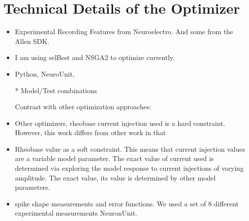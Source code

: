 \section*{Technical Details of the Optimizer}
\begin{itemize}

\item Experimental Recording Features from Neuroelectro. And some from the Allen SDK.
\item I am using selBest and NSGA2 to optimize currently.
\item Python, NeuroUnit, 

* Model/Test combinations

Contrast with other optimization approaches:

\item Other optimizers, rheobase current injection used is a hard constraint. However, this work differs from other work in that 
\item Rheobase value as a soft constraint. This means that current injection values are a variable model parameter. The exact value of current used is determined via exploring the model response to current injections of varying amplitude. The exact value, its value is determined by other model parameters.

\item spike shape measurements and error functions. We used a set of 8 different experimental measurements NeuronUnit.
\end{itemize}
